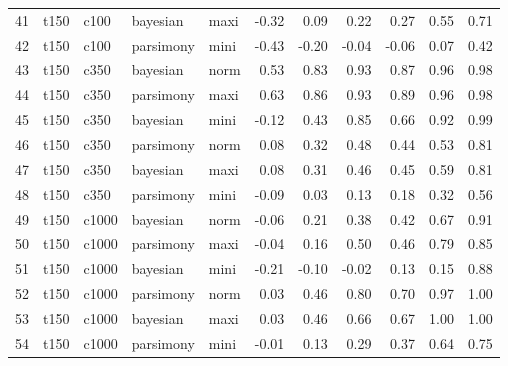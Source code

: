 \documentclass[12pt,letterpaper]{article}
\begin{document}
\begin{longtable}{rllllrrrrrr}
  41 & t150 & c100 & bayesian & maxi & -0.32 & 0.09 & 0.22 & 0.27 & 0.55 & 0.71 \\ 
  42 & t150 & c100 & parsimony & mini & -0.43 & -0.20 & -0.04 & -0.06 & 0.07 & 0.42 \\ 
  43 & t150 & c350 & bayesian & norm & 0.53 & 0.83 & 0.93 & 0.87 & 0.96 & 0.98 \\ 
  44 & t150 & c350 & parsimony & maxi & 0.63 & 0.86 & 0.93 & 0.89 & 0.96 & 0.98 \\ 
  45 & t150 & c350 & bayesian & mini & -0.12 & 0.43 & 0.85 & 0.66 & 0.92 & 0.99 \\ 
  46 & t150 & c350 & parsimony & norm & 0.08 & 0.32 & 0.48 & 0.44 & 0.53 & 0.81 \\ 
  47 & t150 & c350 & bayesian & maxi & 0.08 & 0.31 & 0.46 & 0.45 & 0.59 & 0.81 \\ 
  48 & t150 & c350 & parsimony & mini & -0.09 & 0.03 & 0.13 & 0.18 & 0.32 & 0.56 \\ 
  49 & t150 & c1000 & bayesian & norm & -0.06 & 0.21 & 0.38 & 0.42 & 0.67 & 0.91 \\ 
  50 & t150 & c1000 & parsimony & maxi & -0.04 & 0.16 & 0.50 & 0.46 & 0.79 & 0.85 \\ 
  51 & t150 & c1000 & bayesian & mini & -0.21 & -0.10 & -0.02 & 0.13 & 0.15 & 0.88 \\ 
  52 & t150 & c1000 & parsimony & norm & 0.03 & 0.46 & 0.80 & 0.70 & 0.97 & 1.00 \\ 
  53 & t150 & c1000 & bayesian & maxi & 0.03 & 0.46 & 0.66 & 0.67 & 1.00 & 1.00 \\ 
  54 & t150 & c1000 & parsimony & mini & -0.01 & 0.13 & 0.29 & 0.37 & 0.64 & 0.75 \\ 
   \hline
\end{longtable}
\end{document}
